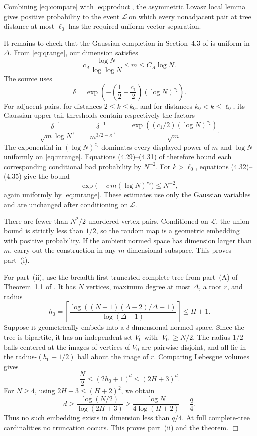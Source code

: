 \documentclass[11pt]{article}
\begin{document}
Combining \eqref{eq:compare} with \eqref{eq:product}, the asymmetric
Lovasz local lemma gives positive probability to the event $\mathcal L$ on
which every nonadjacent pair at tree distance at most $\ell_0$ has the
required uniform-vector separation.

It remains to check that the Gaussian completion in Section~4.3 of
\cite{ADTT} is uniform in $\Delta$. From \eqref{eq:qrange}, our dimension
satisfies
\begin{equation}\label{eq:mrange}
 c_A\frac{\log N}{\log\log N}\leq m\leq C_A\log N.
\end{equation}
The source uses
\[
 \delta=
 \exp\left(-\left(\frac12-\frac{c_1}{2}\right)(\log N)^{c_2}\right).
\]
For adjacent pairs, for distances $2\leq k\leq k_0$, and for distances
$k_0<k\leq\ell_0$, its Gaussian upper-tail thresholds contain respectively
the factors
\[
 \frac{\delta^{-1}}{\sqrt m\log N},
 \qquad
 \frac{\delta^{-1}}{m^{3/2-\kappa}},
 \qquad
 \frac{\exp((c_1/2)(\log N)^{c_2})}{\sqrt m}.
\]
The exponential in $(\log N)^{c_2}$ dominates every displayed power of
$m$ and $\log N$ uniformly on \eqref{eq:mrange}. Equations (4.29)--(4.31)
of \cite{ADTT} therefore bound each corresponding conditional bad
probability by $N^{-2}$. For $k>\ell_0$, equations (4.32)--(4.35) give the
bound
\[
 \exp\bigl(-c\,m(\log N)^{c_2}\bigr)\leq N^{-2},
\]
again uniformly by \eqref{eq:mrange}. These estimates use only the Gaussian
variables and are unchanged after conditioning on $\mathcal L$.

There are fewer than $N^2/2$ unordered vertex pairs. Conditioned on
$\mathcal L$, the union bound is strictly less than $1/2$, so the random map
is a geometric embedding with positive probability. If the ambient normed
space has dimension larger than $m$, carry out the construction in any
$m$-dimensional subspace. This proves part~(i).

For part~(ii), use the breadth-first truncated complete tree from part~(A) of
Theorem~1.1 of \cite{ADTT}. It has $N$ vertices, maximum degree at most
$\Delta$, a root $r$, and radius
\[
 h_0=\left\lceil
 \frac{\log\left((N-1)(\Delta-2)/\Delta+1\right)}
 {\log(\Delta-1)}
 \right\rceil\leq H+1.
\]
Suppose it geometrically embeds into a $d$-dimensional normed space. Since
the tree is bipartite, it has an independent set $V_0$ with
$|V_0|\geq N/2$. The radius-$1/2$ balls centered at the images of vertices
of $V_0$ are pairwise disjoint, and all lie in the radius-$(h_0+1/2)$ ball
about the image of $r$. Comparing Lebesgue volumes gives
\[
 \frac N2\leq(2h_0+1)^d\leq(2H+3)^d.
\]
For $N\geq4$, using $2H+3\leq(H+2)^2$, we obtain
\[
 d\geq\frac{\log(N/2)}{\log(2H+3)}
 \geq\frac{\log N}{4\log(H+2)}=\frac q4.
\]
Thus no such embedding exists in dimension less than $q/4$. At full
complete-tree cardinalities no truncation occurs. This proves part~(ii) and
the theorem. \hfill$\Box$
\end{document}

